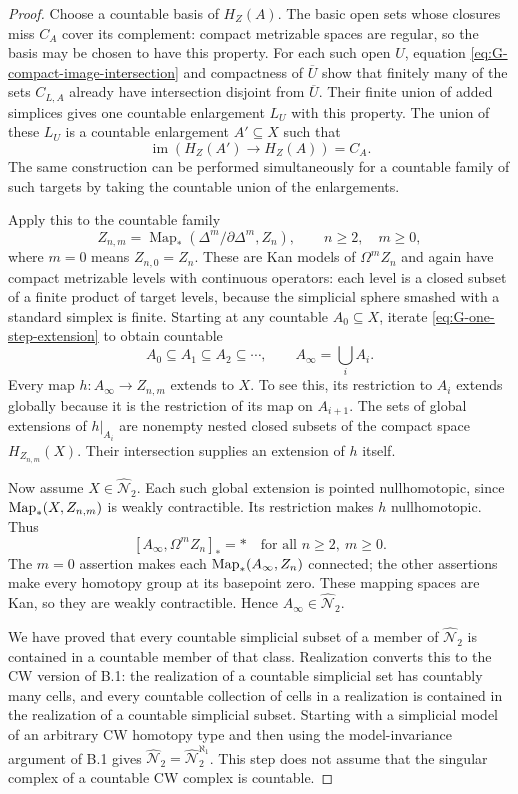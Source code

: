\begin{proof}
Choose a countable basis of $H_Z(A)$. The basic open sets whose closures miss $C_A$ cover its complement: compact metrizable spaces are regular, so the basis may be chosen to have this property. For each such open $U$, equation \eqref{eq:G-compact-image-intersection} and compactness of $\overline U$ show that finitely many of the sets $C_{L,A}$ already have intersection disjoint from $\overline U$. Their finite union of added simplices gives one countable enlargement $L_U$ with this property. The union of these $L_U$ is a countable enlargement $A'\subseteq X$ such that
\begin{equation}\label{eq:G-one-step-extension}
 \operatorname{im}(H_Z(A')\to H_Z(A))=C_A.
\end{equation}
The same construction can be performed simultaneously for a countable family of such targets by taking the countable union of the enlargements.

Apply this to the countable family
\[
 Z_{n,m}=\operatorname{Map}_*(\Delta^m/\partial\Delta^m,Z_n),
       \qquad n\geq2,\quad m\geq0,
\]
where $m=0$ means $Z_{n,0}=Z_n$. These are Kan models of $\Omega^m Z_n$ and again have compact metrizable levels with continuous operators: each level is a closed subset of a finite product of target levels, because the simplicial sphere smashed with a standard simplex is finite. Starting at any countable $A_0\subseteq X$, iterate \eqref{eq:G-one-step-extension} to obtain countable
\[
 A_0\subseteq A_1\subseteq A_2\subseteq\cdots,
 \qquad A_\infty=\bigcup_i A_i.
\]
Every map $h:A_\infty\to Z_{n,m}$ extends to $X$. To see this, its restriction to $A_i$ extends globally because it is the restriction of its map on $A_{i+1}$. The sets of global extensions of $h|_{A_i}$ are nonempty nested closed subsets of the compact space $H_{Z_{n,m}}(X)$. Their intersection supplies an extension of $h$ itself.

Now assume $X\in\widehat{\mathcal N}_2$. Each such global extension is pointed nullhomotopic, since $\operatorname{Map}_*(X,Z_{n,m})$ is weakly contractible. Its restriction makes $h$ nullhomotopic. Thus
\[
 [A_\infty,\Omega^m Z_n]_* = *
       \quad\text{for all }n\geq2,\ m\geq0.
\]
The $m=0$ assertion makes each $\operatorname{Map}_*(A_\infty,Z_n)$ connected; the other assertions make every homotopy group at its basepoint zero. These mapping spaces are Kan, so they are weakly contractible. Hence $A_\infty\in\widehat{\mathcal N}_2$.

We have proved that every countable simplicial subset of a member of $\widehat{\mathcal N}_2$ is contained in a countable member of that class. Realization converts this to the CW version of B.1: the realization of a countable simplicial set has countably many cells, and every countable collection of cells in a realization is contained in the realization of a countable simplicial subset. Starting with a simplicial model of an arbitrary CW homotopy type and then using the model-invariance argument of B.1 gives
$\widehat{\mathcal N}_2=\widehat{\mathcal N}_2^{\aleph_1}$. This step does not assume that the singular complex of a countable CW complex is countable.


\end{proof}
